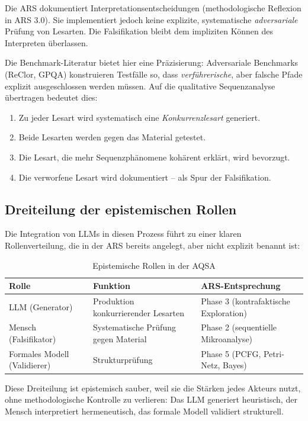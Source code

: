 \documentclass[12pt,a4paper]{article}
\begin{document}
Die ARS dokumentiert Interpretationsentscheidungen (methodologische Reflexion in ARS 3.0). Sie implementiert jedoch keine explizite, systematische \textit{adversariale} Prüfung von Lesarten. Die Falsifikation bleibt dem impliziten Können des Interpreten überlassen.

Die Benchmark-Literatur bietet hier eine Präzisierung: Adversariale Benchmarks (ReClor, GPQA) konstruieren Testfälle so, dass \textit{verführerische}, aber falsche Pfade explizit ausgeschlossen werden müssen. Auf die qualitative Sequenzanalyse übertragen bedeutet dies:

\begin{enumerate}
    \item Zu jeder Lesart wird systematisch eine \textit{Konkurrenzlesart} generiert.
    \item Beide Lesarten werden gegen das Material getestet.
    \item Die Lesart, die mehr Sequenzphänomene kohärent erklärt, wird bevorzugt.
    \item Die verworfene Lesart wird dokumentiert – als Spur der Falsifikation.
\end{enumerate}

\subsection{Dreiteilung der epistemischen Rollen}

Die Integration von LLMs in diesen Prozess führt zu einer klaren Rollenverteilung, die in der ARS bereits angelegt, aber nicht explizit benannt ist:

\begin{table}[H]
\centering
\caption{Epistemische Rollen in der AQSA}
\label{tab:roles}
\begin{tabular}{@{}lll@{}}
\toprule
Rolle & Funktion & ARS-Entsprechung \\
\midrule
LLM (Generator) & Produktion konkurrierender Lesarten & Phase 3 (kontrafaktische Exploration) \\
Mensch (Falsifikator) & Systematische Prüfung gegen Material & Phase 2 (sequentielle Mikroanalyse) \\
Formales Modell (Validierer) & Strukturprüfung & Phase 5 (PCFG, Petri-Netz, Bayes) \\
\bottomrule
\end{tabular}
\end{table}

Diese Dreiteilung ist epistemisch sauber, weil sie die Stärken jedes Akteurs nutzt, ohne methodologische Kontrolle zu verlieren: Das LLM generiert heuristisch, der Mensch interpretiert hermeneutisch, das formale Modell validiert strukturell.
\end{document}
